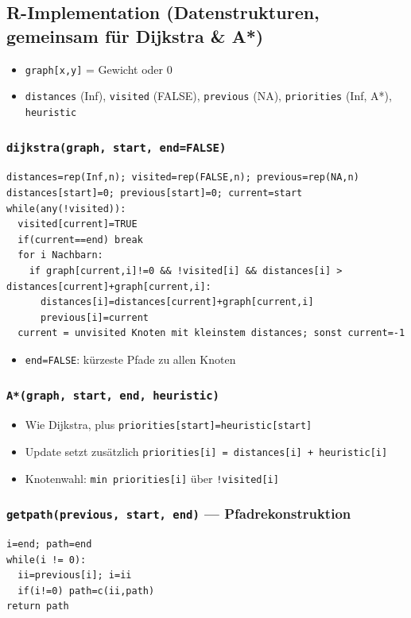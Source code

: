 \documentclass[11pt, a4paper]{article}
\begin{document}
\subsection{R-Implementation (Datenstrukturen, gemeinsam für Dijkstra \& A*)}

\begin{itemize}
  \item \texttt{graph[x,y]} = Gewicht oder 0
  \item \texttt{distances} (Inf), \texttt{visited} (FALSE), \texttt{previous} (NA), \texttt{priorities} (Inf, A*), \texttt{heuristic}
\end{itemize}


\subsubsection{\texttt{dijkstra(graph, start, end=FALSE)}}
\begin{lstlisting}
distances=rep(Inf,n); visited=rep(FALSE,n); previous=rep(NA,n)
distances[start]=0; previous[start]=0; current=start
while(any(!visited)):
  visited[current]=TRUE
  if(current==end) break
  for i Nachbarn:
    if graph[current,i]!=0 && !visited[i] && distances[i] > distances[current]+graph[current,i]:
      distances[i]=distances[current]+graph[current,i]
      previous[i]=current
  current = unvisited Knoten mit kleinstem distances; sonst current=-1
\end{lstlisting}

\begin{itemize}
  \item \texttt{end=FALSE}: kürzeste Pfade zu allen Knoten
\end{itemize}


\subsubsection{\texttt{A*(graph, start, end, heuristic)}}
\begin{itemize}
  \item Wie Dijkstra, plus \texttt{priorities[start]=heuristic[start]}
  \item Update setzt zusätzlich \texttt{priorities[i] = distances[i] + heuristic[i]}
  \item Knotenwahl: \texttt{min priorities[i]} über \texttt{!visited[i]}
\end{itemize}


\subsubsection{\texttt{getpath(previous, start, end)} — Pfadrekonstruktion}
\begin{lstlisting}
i=end; path=end
while(i != 0):
  ii=previous[i]; i=ii
  if(i!=0) path=c(ii,path)
return path
\end{lstlisting}
\end{document}

